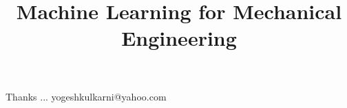 \documentclass[xcolor=dvipsnames,compress,t,pdf,notes]{beamer}
\title[\insertframenumber /\inserttotalframenumber]{Machine Learning for Mechanical Engineering}
\begin{document}
	\begin{frame}
	\titlepage
	\end{frame}

	
	\newpage 
	

	\begin{frame}[c]{}
	Thanks ...
	\vspace{5mm}
	yogeshkulkarni@yahoo.com
	\end{frame}
\end{document}

